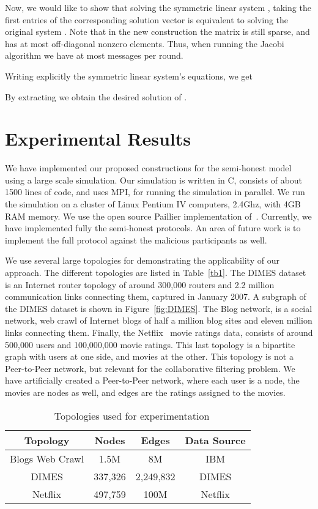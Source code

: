 \documentclass[10pt]{svjour3}
\begin{document}
Now, we would like to show that solving the symmetric linear
system , taking the first 
entries of the corresponding solution vector  is
equivalent to solving the original system . Note that
in the new construction the matrix  is still sparse,
and has at most  off-diagonal nonzero elements. Thus, when
running the Jacobi algorithm we have at most  messages per
round.

Writing explicitly the symmetric linear system's equations, we get


By extracting  we obtain  the desired solution of
.

\section{Experimental Results}
\label{exp} We have implemented our proposed constructions
for the semi-honest model using a
large scale simulation. Our simulation is written in C, consists
of about 1500 lines of code, and uses MPI, for running the
simulation in parallel. We run the simulation on a cluster of
Linux Pentium IV computers, 2.4Ghz, with 4GB RAM memory. We use
the open source Paillier implementation of~\cite{PaillierIMP}.
Currently, we have implemented fully the semi-honest protocols.
An area of future work is to implement the full protocol against
the malicious participants as well.

We use several large topologies for demonstrating the
applicability of our approach. The different topologies are listed
in Table~\ref{tb1}. The DIMES dataset \cite{DIMES} is an Internet
router topology of around 300,000 routers and 2.2 million
communication links connecting them, captured in January 2007. A
subgraph of the DIMES dataset is shown in Figure~\ref{fig:DIMES}.
The Blog network, is a social network, web crawl of Internet blogs
of half a million blog sites and eleven million links connecting
them. Finally, the Netflix~\cite{Netflix} movie ratings data,
consists of around 500,000 users and 100,000,000 movie ratings.
This last topology is a bipartite graph with users at one side,
and movies at the other. This topology is not a Peer-to-Peer
network, but relevant for the collaborative filtering problem. We
have artificially created a Peer-to-Peer network, where each user
is a node, the movies are nodes as well, and edges are the ratings
assigned to the movies.

\begin{table}[h!]
\begin{center}
\begin{tabular}{|c|c|c|c|}
  \hline
Topology & Nodes & Edges & Data Source \\
  \hline
  Blogs Web Crawl & 1.5M & 8M & IBM \\
  DIMES & 337,326  & 2,249,832 & DIMES  \\
  Netflix & 497,759 & 100M & Netflix \\
  \hline
\end{tabular}
\caption{\mbox{              } Topologies used for
experimentation}
\end{center}
\end{table}\label{tb1}
\vspace{-5mm}
\end{document}
